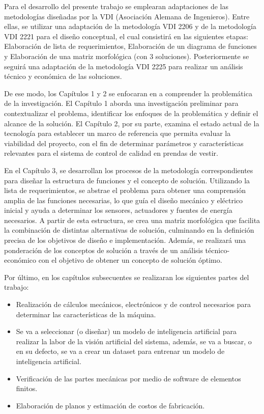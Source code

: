 Para el desarrollo del presente trabajo se emplearan adaptaciones de las metodologías diseñadas por la VDI (Asociación Alemana de Ingenieros). Entre ellas, se utilizar una adaptación de la metodología VDI 2206 \cite{VDIVDE2206_2021} y de la metodología VDI 2221 \cite{VDI2221_2019} para el diseño conceptual, el cual consistirá en las siguientes etapas: Elaboración de lista de requerimientos, Elaboración de un diagrama de funciones y Elaboración de una matriz morfológica (con 3 soluciones). Posteriormente se seguirá una adaptación de la metodología VDI 2225 \cite{VDI2225_series} para realizar un análisis técnico y económica de las soluciones.

De ese modo, los Capítulos 1 y 2 se enfocaran en a comprender la problemática de la investigación. El Capítulo 1 aborda una investigación preliminar para contextualizar el problema, identificar los enfoques de la problemática y definir el alcance de la solución. El Capítulo 2, por su parte, examina el estado actual de la tecnología para establecer un marco de referencia que permita evaluar la viabilidad del proyecto, con el fin de determinar parámetros y características relevantes para el sistema de control de calidad en prendas de vestir.

En el Capítulo 3, se desarrollan los procesos de la metodología correspondientes para diseñar la estructura de funciones y el concepto de solución. Utilizando la lista de requerimientos, se abstrae el problema para obtener una comprensión amplia de las funciones necesarias, lo que guía el diseño mecánico y eléctrico inicial y ayuda a determinar los sensores, actuadores y fuentes de energía necesarios. A partir de esta estructura, se crea una matriz morfológica que facilita la combinación de distintas alternativas de solución, culminando en la definición precisa de los objetivos de diseño e implementación. Además, se realizará una ponderación de los conceptos de solución a través de un análisis técnico-económico con el objetivo de obtener un concepto de solución óptimo.

Por último, en los capítulos subsecuentes se realizaran los siguientes partes del trabajo:

\begin{itemize}
	\setlength\itemsep{-0.5em}
	\item Realización de cálculos mecánicos, electrónicos y de control necesarios para determinar las características de la máquina.
	\item Se va a seleccionar (o diseñar) un modelo de inteligencia artificial para realizar la labor de la visión artificial del sistema, además, se va a buscar, o en su defecto, se va a crear un dataset para entrenar un modelo de inteligencia artificial.
	\item Verificación de las partes mecánicas por medio de software de elementos finitos.
	\item Elaboración de planos y estimación de costos de fabricación.
\end{itemize}


